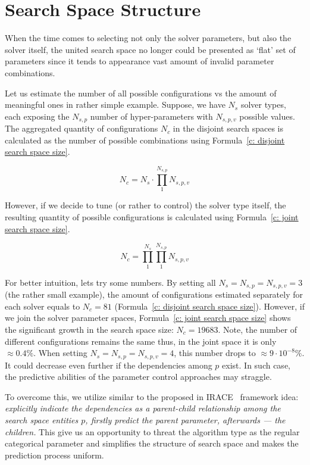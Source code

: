 \section{Search Space Structure}\label{concept:search space}
When the time comes to selecting not only the solver parameters, but also the solver itself, the united search space no longer could be presented as `flat' set of parameters since it tends to appearance vast amount of invalid parameter combinations.

Let us estimate the number of all possible configurations vs the amount of meaningful ones in rather simple example.
Suppose, we have $N_s$ solver types, each exposing the $N_{s,p}$ number of hyper-parameters with $N_{s,p,v}$ possible values. The aggregated quantity of configurations $N_c$ in the disjoint search spaces is calculated as the number of possible combinations using Formula~\ref{c: disjoint search space size}.

\begin{equation}
N_c = N_s \cdot \prod_{1}^{N_{s,p}} N_{s,p,v}
\label{c: disjoint search space size}
\end{equation}

However, if we decide to tune (or rather to control) the solver type itself, the resulting quantity of possible configurations is calculated using Formula~\ref{c: joint search space size}.

\begin{equation}
N_c = \prod_{1}^{N_{s}} \prod_{1}^{N_{s,p}} N_{s,p,v}
\label{c: joint search space size}
\end{equation}

For better intuition, lets try some numbers. By setting all $N_s = N_{s,p} = N_{s,p,v} = 3$ (the rather small example), the amount of configurations estimated separately for each solver equals to $N_c = 81$ (Formula~\ref{c: disjoint search space size}). However, if we join the solver parameter spaces, Formula~\ref{c: joint search space size} shows the significant growth in the search space size: $N_c = 19683$. Note, the number of different configurations remains the same thus, in the joint space it is only $\approx 0.4\%$. When setting $N_s = N_{s,p} = N_{s,p,v} = 4$, this number drops to $\approx 9 \cdot 10^{-8}\%$. It could decrease even further if the dependencies among $p$ exist. In such case, the predictive abilities of the parameter control approaches may straggle.

To overcome this, we utilize similar to the proposed in IRACE~\cite{lopez2016irace} framework idea: \emph{explicitly indicate the dependencies as a parent-child relationship among the search space entities $p$, firstly predict the parent parameter, afterwards — the children.} This give us an opportunity to threat the algorithm type as the regular categorical parameter and simplifies the structure of search space and makes the prediction process uniform.

